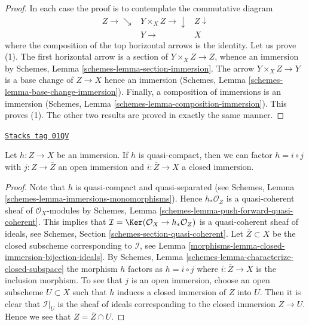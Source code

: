 \begin{proof}
In each case the proof is to contemplate the commutative diagram
$$
\begin{array}{ccc}Z \longrightarrow\searrow & Y \times_X Z \longrightarrow\downarrow & Z \downarrow \\  & Y \longrightarrow & X\end{array}
$$
where the composition of the top horizontal arrows is the identity.
Let us prove (1). The first horizontal arrow is a section of
$Y \times_X Z \to Z$, whence an immersion by
Schemes, Lemma \ref{schemes-lemma-section-immersion}.
The arrow $Y \times_X Z \to Y$ is a base change of $Z \to X$ hence
an immersion (Schemes, Lemma \ref{schemes-lemma-base-change-immersion}).
Finally, a composition of immersions is an immersion
(Schemes, Lemma \ref{schemes-lemma-composition-immersion}). This proves (1).
The other two results are proved in exactly the same manner.
\end{proof}

\begin{lemma}
\label{morphisms-lemma-factor-quasi-compact-immersion}
\href{https://stacks.math.columbia.edu/tag/01QV}{\texttt{Stacks tag 01QV}}

Let $h : Z \to X$ be an immersion.
If $h$ is quasi-compact, then we can factor
$h = i \circ j$ with $j : Z \to \overline{Z}$ an
open immersion and $i : \overline{Z} \to X$ a closed immersion.
\end{lemma}

\begin{proof}

Note that $h$ is quasi-compact and quasi-separated (see
Schemes, Lemma \ref{schemes-lemma-immersions-monomorphisms}).
Hence $h_*\mathcal{O}_Z$ is a quasi-coherent sheaf of $\mathcal{O}_X$-modules
by Schemes, Lemma \ref{schemes-lemma-push-forward-quasi-coherent}.
This implies that
$\mathcal{I} = \Ker(\mathcal{O}_X \to h_*\mathcal{O}_Z)$
is a quasi-coherent sheaf of ideals, see
Schemes, Section \ref{schemes-section-quasi-coherent}.
Let $\overline{Z} \subset X$ be the closed subscheme corresponding
to $\mathcal{I}$, see Lemma \ref{morphisms-lemma-closed-immersion-bijection-ideals}.
By Schemes, Lemma \ref{schemes-lemma-characterize-closed-subspace}
the morphism $h$ factors as
$h = i \circ j$ where $i : \overline{Z} \to X$ is the inclusion morphism.
To see that $j$ is an open immersion, choose an open subscheme
$U \subset X$ such that $h$ induces a closed immersion of $Z$
into $U$. Then it is clear that $\mathcal{I}|_U$ is the
sheaf of ideals corresponding to the closed immersion $Z \to U$.
Hence we see that $Z = \overline{Z} \cap U$.
\end{proof}

